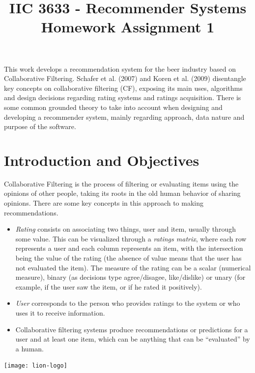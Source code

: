 \documentclass[letterpaper, 10 pt, conference]{ieeeconf}  %
\title{\LARGE \bf
IIC 3633 - Recommender Systems\\
Homework Assignment 1
}
\begin{document}
\maketitle
\thispagestyle{empty}
\pagestyle{empty}




This work develops a recommendation system for the beer industry based on Collaborative Filtering. Schafer et al. (2007) \cite{c1} and Koren et al. (2009) \cite{c3} disentangle key concepts on collaborative filtering (CF), exposing its main uses, algorithms and design decisions regarding rating systems and ratings acquisition. 
There is some common grounded theory to take into account when designing and developing a recommender system, mainly regarding approach, data nature and purpose of the software.

\section{Introduction and Objectives}

Collaborative Filtering is the process of filtering or evaluating items using the opinions of other people, taking its roots in the old human behavior of sharing opinions. There are some key concepts in this approach to making recommendations. 

\begin{itemize}

    \item \textit{Rating} consists on associating two things, user and item, usually through some value. This can be visualized through a \textit{ratings matrix}, where each row represents a user and each column represents an item, with the intersection being the value of the rating (the absence of value means that the user has not evaluated the item). The measure of the rating can be a scalar (numerical measure), binary (as decisions type agree/disagee, like/dislike) or unary (for example, if the user saw the item, or if he rated it positively).

    \item \textit{User} corresponds to the person who provides ratings to the system or who uses it to receive information.
    
    \item Collaborative filtering systems produce recommendations or predictions for a user and at least one item, which can be anything that can be ``evaluated'' by a human.

\end{itemize}\texttt{[image: lion-logo]}
\end{document}
